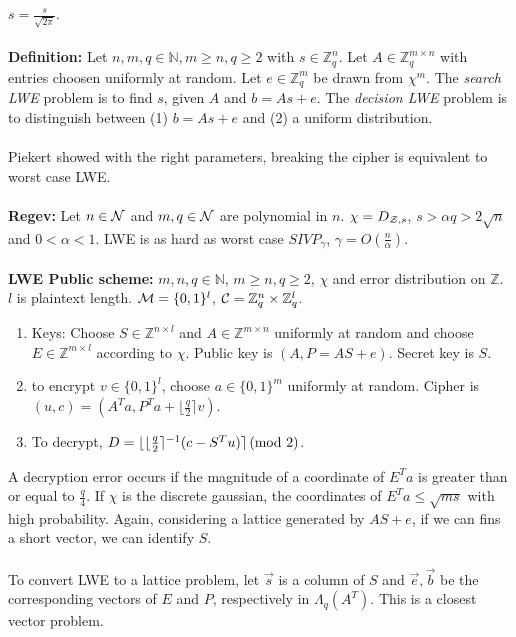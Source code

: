 $s = {\frac {s} {\sqrt{2 \pi}}}$.
\\
\\
{\bf Definition: } Let $n, m, q \in {\mathbb N}, m \geq n, q \geq 2$ with 
$s \in {\mathbb Z}_q^n$.  Let $A \in {\mathbb Z}_q^{m \times n}$ with entries choosen uniformly at random.
Let $e \in {\mathbb Z}_q^m$ be drawn from $\chi^m$.
The \emph{search LWE} problem is to find $s$, given $A$ and $b =As+e$.
The \emph{decision LWE} problem is to distinguish between (1) $b = As +e$ and (2) a uniform distribution.
\\
\\
Piekert showed with the right parameters, breaking the cipher is equivalent to worst case LWE.\\
\\
{\bf Regev:} Let $n \in {\cal N}$ and $m, q \in {\cal N}$ are polynomial in $n$.  $\chi = D_{{\cal Z}, s}$,
$s > \alpha q > 2 \sqrt{n}$ and $0 < \alpha < 1$.  LWE is as hard as worst case $SIVP_{\gamma}$, $\gamma = O({\frac n {\alpha}})$.
\\
\\
{\bf LWE Public scheme: }
$m,n,q \in {\mathbb N}$, $m \geq n, q \geq 2$, $\chi$ and error distribution on ${\mathbb Z}$.  $l$ is plaintext
length.  ${\cal M} = \{0, 1\}^l$, ${\cal C} = {\mathbb Z}_q^n \times {\mathbb Z}_q^l$.
\begin{enumerate}
\item Keys: Choose 
$S \in {\mathbb Z}^{n \times l}$ and 
$A \in {\mathbb Z}^{m \times n}$ uniformly at random and choose
$E \in {\mathbb Z}^{m \times l}$  according to $\chi$.  Public key is $(A, P=AS+e)$.  Secret key is $S$.
\item to encrypt $v \in \{ 0, 1\}^l$, choose $a \in \{0, 1 \}^m$ uniformly at random.  Cipher is
$(u,c) = (A^Ta, P^Ta + \lfloor {\frac q 2} \rceil v)$.
\item To decrypt, $D = \lfloor \lfloor {\frac q 2}\rceil^{-1} (c - S^Tu)\rceil \thinspace \textnormal{(mod } 2 \textnormal{)}$.
\end{enumerate}
A decryption error occurs if the magnitude of a coordinate of $E^Ta$ is greater than or equal to ${\frac q 4}$.
If $\chi$ is the discrete gaussian, the coordinates of $E^Ta \leq \sqrt{ms}$ with high probability.
Again, considering a lattice generated by $AS+e$, if we can fins a short vector, we can identify $S$.
\\
\\
To convert LWE to a lattice problem, let ${\vec s}$ is a column of $S$ and ${\vec e}, {\vec b}$ be
the corresponding vectors of $E$ and $P$, respectively in $\Lambda_q(A^T)$.  This is a closest vector problem.
